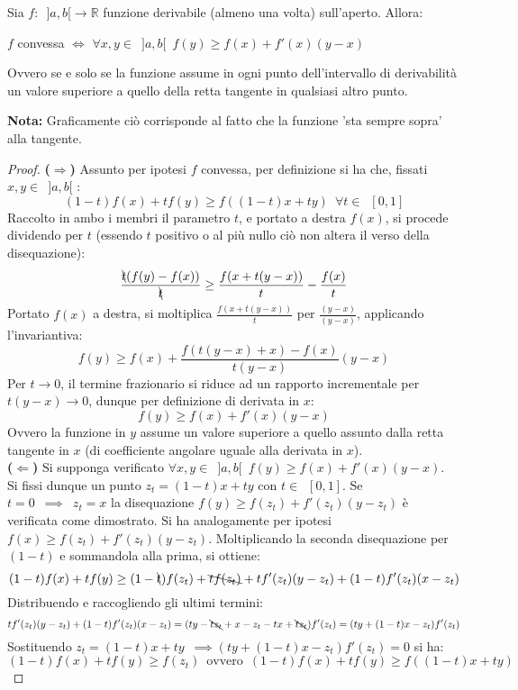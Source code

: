 \documentclass[10pt]{article}
\theoremstyle{plain}
\begin{document}
\begin{ther}
Sia $f : \enspace ]a, b[ \rightarrow \mathbb{R}$ funzione derivabile (almeno una volta) sull'aperto. Allora:
\begin{center}
    $f$ convessa $\Longleftrightarrow$ $\forall x,y \in \enspace ]a, b[ \enspace f(y) \geq f(x) + f'(x) (y-x)$\\
\end{center}
Ovvero se e solo se la funzione assume in ogni punto dell'intervallo di derivabilità un valore superiore a quello della retta tangente in qualsiasi altro punto.
\end{ther}
\textbf{Nota:} Graficamente ciò corrisponde al fatto che la funzione 'sta sempre sopra' alla tangente. 
\begin{proof}
\textbf{($\Rightarrow$)} Assunto per ipotesi $f$ convessa, per definizione si ha che, fissati $x, y \in \enspace ]a, b[$ : 
\[(1-t) f(x) + t f(y) \geq f((1-t) x + t y) \enspace \forall t \in \enspace [0, 1]\]
Raccolto in ambo i membri il parametro $t$, e portato a destra $f(x)$, si procede dividendo per $t$ (essendo $t$ positivo o al più nullo ciò non altera il verso della disequazione):
\[\frac{\bcancel{t} (f(y) - f(x))}{\bcancel{t}} \geq \frac{f(x + t (y - x))}{t} - \frac{f(x)}{t}\]
Portato $f(x)$ a destra, si moltiplica $\frac{f(x + t (y - x))}{t}$ per $\frac{(y - x)}{(y - x)}$, applicando l'invariantiva:
\[f(y) \geq f(x) + \frac{f(t(y-x) + x) - f(x)}{t (y-x)}(y - x)\]
Per $t \rightarrow 0$, il termine frazionario si riduce ad un rapporto incrementale per $t (y - x) \rightarrow 0$, dunque per definizione di derivata in $x$:
\[f(y) \geq f(x) + f'(x) (y - x)\]
Ovvero la funzione in $y$ assume un valore superiore a quello assunto dalla retta tangente in $x$ (di coefficiente angolare uguale alla derivata in $x$).\\
\textbf{($\Leftarrow$)} Si supponga verificato $\forall x, y \in \enspace ]a, b[ \enspace f(y) \geq f(x) + f'(x) (y - x)$.
\\Si fissi dunque un punto $z_t = (1 - t) x + t y$ con $t \in \enspace [0,1]$. Se $t = 0 \enspace \implies \enspace z_t = x$ la disequazione $f(y) \geq f(z_t) + f'(z_t) (y - z_t)$ è verificata come dimostrato. Si ha analogamente per ipotesi $f(x) \geq f(z_t) + f'(z_t) (y - z_t)$. Moltiplicando la seconda disequazione per $(1 - t)$ e sommandola alla prima, si ottiene:
\[(1-t) f(x) + t f(y) \geq (1-\bcancel{t}) f(z_t) + \bcancel{t f(z_t)}+ t f'(z_t) (y - z_t) + (1 - t) f'(z_t) (x - z_t)\]
Distribuendo e raccogliendo gli ultimi termini:
\[t f'(z_t) (y - z_t) + (1 - t) f'(z_t) (x - z_t) = (t y - \bcancel{t z_t} + x - z_t - t x + \bcancel{t z_t}) f'(z_t) = (t y + (1-t) x - z_t) f'(z_t)\]
Sostituendo $z_t = (1 - t) x + t y \enspace \implies (t y + (1-t) x - z_t) f'(z_t) = 0$ si ha:
\[(1- t) f(x) + t f(y) \geq f(z_t) \enspace \textrm{ovvero} \enspace (1-t) f(x) + t f(y) \geq f((1-t) x + t y)\]
\end{proof}
\end{document}
